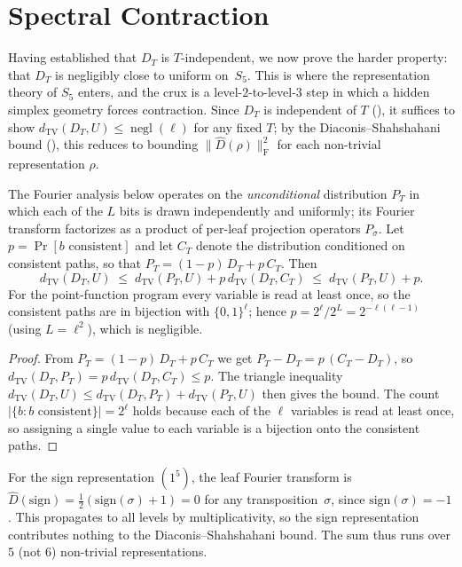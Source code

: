 \documentclass[version=final]{iacrcc}
\DeclareMathOperator{\negl}{negl}
\newcommand{\norm}[1]{\lVert #1 \rVert}
\newcommand{\abs}[1]{\lvert #1 \rvert}
\newcommand{\frob}[1]{\norm{#1}_{\mathrm{F}}}
\newcommand{\dtv}{d_{\mathrm{TV}}}
\newcommand{\Dhat}{\widehat{D}}
\begin{document}
\section{Spectral Contraction}
\label{sec:contraction}

Having established that $D_T$ is $T$-independent, we now prove the harder
property: that $D_T$ is negligibly close to uniform on~$S_5$. This is where the
representation theory of $S_5$ enters, and the crux is a level-$2$-to-level-$3$
step in which a hidden simplex geometry forces contraction. Since $D_T$ is
independent of $T$ (), it suffices to show
$\dtv(D_T, U) \leq \negl(\ell)$ for any fixed $T$; by the
Diaconis--Shahshahani bound (), this reduces to bounding
$\frob{\Dhat(\rho)}^2$ for each non-trivial representation $\rho$.

\begin{lemma}[Conditioning]
\label{lem:conditioning}
The Fourier analysis below operates on the \emph{unconditional} distribution
$P_T$ in which each of the $L$ bits is drawn independently and uniformly; its
Fourier transform factorizes as a product of per-leaf projection operators
$P_\sigma$. Let $p = \Pr[b \text{ consistent}]$ and let $C_T$ denote the
distribution conditioned on consistent paths, so that
$P_T = (1-p)\,D_T + p\,C_T$. Then
\[
\dtv(D_T, U) \;\leq\; \dtv(P_T, U) + p\,\dtv(D_T, C_T)
\;\leq\; \dtv(P_T, U) + p .
\]
For the point-function program every variable is read at least once, so the
consistent paths are in bijection with $\{0,1\}^\ell$; hence
$p = 2^\ell / 2^L = 2^{-\ell(\ell-1)}$ (using $L = \ell^2$), which is negligible.
\end{lemma}

\begin{proof}
From $P_T = (1-p)\,D_T + p\,C_T$ we get $P_T - D_T = p\,(C_T - D_T)$, so
$\dtv(D_T, P_T) = p\,\dtv(D_T, C_T) \leq p$. The triangle inequality
$\dtv(D_T, U) \leq \dtv(D_T, P_T) + \dtv(P_T, U)$ then gives the bound. The count
$\abs{\{b : b \text{ consistent}\}} = 2^\ell$ holds because each of the $\ell$
variables is read at least once, so assigning a single value to each variable is a
bijection onto the consistent paths.
\end{proof}

\begin{remark}
\label{rem:sign}
For the sign representation $(1^5)$, the leaf Fourier transform is
$\Dhat(\mathrm{sign}) = \frac{1}{2}(\mathrm{sign}(\sigma) + 1) = 0$
for any transposition~$\sigma$, since $\mathrm{sign}(\sigma) = -1$.
This propagates to all levels by multiplicativity, so the sign
representation contributes nothing to the Diaconis--Shahshahani bound.
The sum thus runs over $5$ (not $6$) non-trivial representations.
\end{remark}
\end{document}
